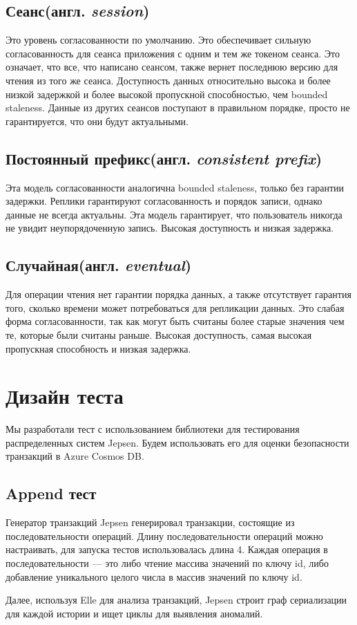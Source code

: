 \documentclass[12pt,  openany]{book}
\begin{document}
\subsection{Сеанс(англ.  \textit{session})}
Это уровень согласованности по умолчанию. Это обеспечивает сильную согласованность для сеанса приложения с одним и тем же токеном сеанса. Это означает, что все, что написано сеансом, также вернет последнюю версию для чтения из того же сеанса. Доступность данных относительно высока и более низкой задержкой и более высокой пропускной способностью, чем bounded staleness. Данные из других сеансов поступают в правильном порядке, просто не гарантируется, что они будут актуальными.
\subsection{Постоянный префикс(англ.  \textit{consistent prefix})}
Эта модель согласованности аналогична bounded staleness, только без гарантии задержки. Реплики гарантируют согласованность и порядок записи, однако данные не всегда актуальны. Эта модель гарантирует, что пользователь никогда не увидит неупорядоченную запись. Высокая доступность и низкая задержка.
\subsection{Случайная(англ.  \textit{eventual})}
Для операции чтения нет гарантии порядка данных, а также отсутствует гарантия того, сколько времени может потребоваться для репликации данных.  Это слабая форма согласованности, так как могут быть считаны более старые значения чем те, которые были считаны раньше.
Высокая доступность, самая высокая пропускная способность и низкая задержка.

\section{Дизайн теста}
Мы разработали тест с использованием библиотеки для тестирования распределенных систем Jepsen. Будем использовать его для оценки безопасности транзакций в Azure Cosmos DB. 
\subsection{Append тест}
Генератор транзакций Jepsen генерировал транзакции, состоящие из последовательности операций. Длину последовательности операций можно настраивать, для запуска тестов использовалась длина 4. Каждая операция в последовательности --- это либо чтение массива значений по ключу id, либо добавление уникального целого числа в массив значений по ключу id. 
\par
Далее, используя Elle для анализа транзакций, Jepsen строит граф сериализации для каждой истории и ищет циклы для выявления аномалий. 
\end{document}
